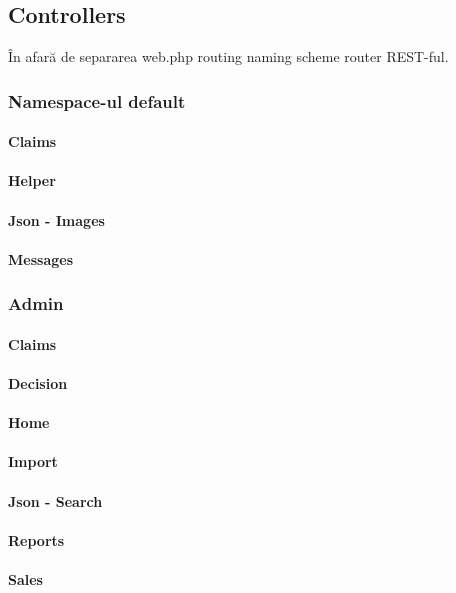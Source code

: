 \subsection{Controllers}

		În afară de separarea
		web.php routing
		naming scheme
		router REST-ful.
		\subsubsection{Namespace-ul default}
			\paragraph{Claims}
			\paragraph{Helper}
			\paragraph{Json - Images}
			\paragraph{Messages}
		\subsubsection{Admin}
			\paragraph{Claims}
			\paragraph{Decision}
			\paragraph{Home}
			\paragraph{Import}
			\paragraph{Json - Search}
			\paragraph{Reports}
			\paragraph{Sales}
